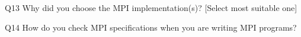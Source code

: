 \begin{description}%
\item{Q13} Why did you choose the MPI implementation(s)? [Select most suitable one]%
\item{Q14} How do you check MPI specifications when you are writing MPI programs?%
\end{description}%
